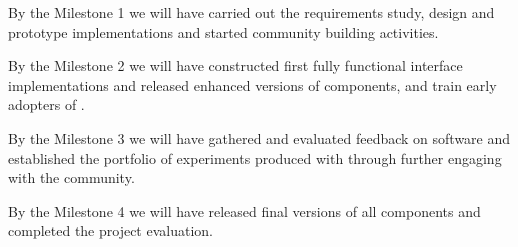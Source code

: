 \begin{milestones}
  {By the Milestone 1 we will have carried out the requirements study, design and prototype implementations and started community building activities.}

  {By the Milestone 2 we will have constructed first fully functional interface implementations and released enhanced versions of \TheProject components, and train early adopters of \TheProject.}

  {By the Milestone 3 we will have gathered and evaluated feedback on \TheProject software and established the portfolio of experiments produced with \TheProject through further engaging with the community.}

  {By the Milestone 4 we will have released final versions of all \TheProject components and completed the project evaluation.}
\end{milestones}


